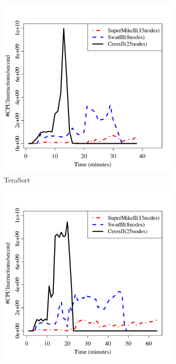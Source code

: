 \documentclass[journal]{IEEEtran}
\begin{document}
\begin{figure}[htb]
	\begin{subfigure}[b]{0.24\textwidth}
                \includegraphics[width=\textwidth]{Figures/SystemFigures/TeraSortIO.pdf}
                \caption{TeraSort}
                \label{fig:TeraSortIO}
    \end{subfigure}
 	\begin{subfigure}[b]{0.24\textwidth}
                \includegraphics[width=\textwidth]{Figures/SystemFigures/WordCountIO.pdf}

\end{subfigure}
\end{figure}
\end{document}
